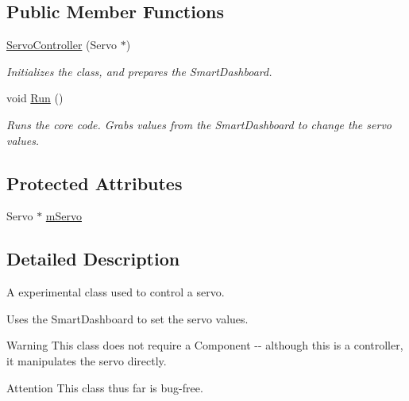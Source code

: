 \subsection*{\-Public \-Member \-Functions}
\begin{DoxyCompactItemize}
\item 
\hyperlink{class_servo_controller_a1b75910a272d4ef6a1ee78e518eae387}{\-Servo\-Controller} (\-Servo $\ast$)
\begin{DoxyCompactList}\small\item\em \-Initializes the class, and prepares the \-Smart\-Dashboard. \end{DoxyCompactList}\item 
void \hyperlink{class_servo_controller_adddcc501b5aa1f997cd276b3b6fe2a72}{\-Run} ()
\begin{DoxyCompactList}\small\item\em \-Runs the core code. \-Grabs values from the \-Smart\-Dashboard to change the servo values. \end{DoxyCompactList}\end{DoxyCompactItemize}
\subsection*{\-Protected \-Attributes}
\begin{DoxyCompactItemize}
\item 
\-Servo $\ast$ \hyperlink{class_servo_controller_a9efdfd24ddb51968e26dc61853011e3e}{m\-Servo}
\end{DoxyCompactItemize}


\subsection{\-Detailed \-Description}
\-A experimental class used to control a servo. 

\-Uses the \-Smart\-Dashboard to set the servo values.

\begin{DoxyWarning}{\-Warning}
\-This class does not require a \-Component -\/-\/ although this is a controller, it manipulates the servo directly.
\end{DoxyWarning}
\begin{DoxyAttention}{\-Attention}
\-This class thus far is bug-\/free. 
\end{DoxyAttention}


